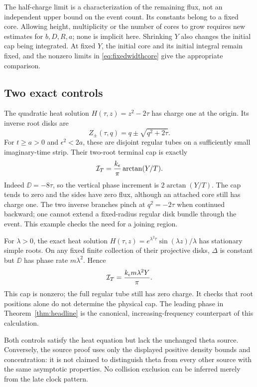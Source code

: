 The half-charge limit is a characterization of the remaining flux,
not an independent upper bound on the event count. Its constants
belong to a fixed core. Allowing height, multiplicity or the number
of cores to grow requires new estimates for $b,D,R,a$; none is
implicit here. Shrinking $Y$ also changes the initial cap being
integrated. At fixed $Y$, the initial core and its initial integral
remain fixed, and the nonzero limits in \eqref{eq:fixedwidthcore}
give the appropriate comparison.

\subsection{Two exact controls}

The quadratic heat solution
$H(\tau,z)=z^2-2\tau$ has charge one at the origin. Its inverse
root disks are
\[
 Z_\pm(\tau,q)=q\pm\sqrt{q^2+2\tau}.
\]
For $t\ge a>0$ and $\epsilon^2<2a$, these are disjoint regular
tubes on a sufficiently small imaginary-time strip. Their two-root
terminal cap is exactly
\begin{equation}
 \mathcal I_T=\frac{k_\epsilon}{\pi}\arctan(Y/T).
 \label{eq:quadraticcap}
\end{equation}
Indeed $\DD=-8\tau$, so the vertical phase increment is
$2\arctan(Y/T)$. The cap tends to zero and the sides have zero
flux, although an attached core still has charge one. The two
inverse branches pinch at $q^2=-2\tau$ when continued backward;
one cannot extend a fixed-radius regular disk bundle through the
event. This example checks the need for a joining region.

For $\lambda>0$, the exact heat solution
$H(\tau,z)=e^{\lambda^2\tau}\sin(\lambda z)/\lambda$
has stationary simple roots. On any fixed finite collection of
their projective disks, $\Delta$ is constant but
$\DD$ has phase rate $m\lambda^2$. Hence
\begin{equation}
 \mathcal I_T=\frac{k_\epsilon m\lambda^2Y}{\pi}.
 \label{eq:sinecap}
\end{equation}
This cap is nonzero; the full regular tube still has zero charge.
It checks that root positions alone do not determine the physical
cap. The leading phase in Theorem~\ref{thm:headline} is the
canonical, increasing-frequency counterpart of this calculation.

Both controls satisfy the heat equation but lack the unchanged
theta source. Conversely, the source proof uses only the displayed
positive density bounds and concentration: it is not claimed to
distinguish theta from every other source with the same asymptotic
properties. No collision exclusion can be inferred merely from
the late clock pattern.

